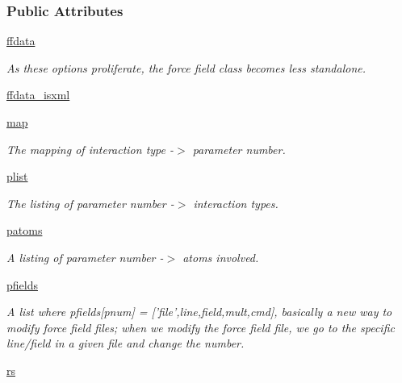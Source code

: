 \subsubsection*{Public Attributes}
\begin{DoxyCompactItemize}
\item 
\hyperlink{classforcebalance_1_1forcefield_1_1FF_aa33e01455044a76e265e6eafbf9c90d6}{ffdata}
\begin{DoxyCompactList}\small\item\em As these options proliferate, the force field class becomes less standalone. \end{DoxyCompactList}\item 
\hyperlink{classforcebalance_1_1forcefield_1_1FF_af942210095e12b4995a64ca461cd5d76}{ffdata\-\_\-isxml}
\item 
\hyperlink{classforcebalance_1_1forcefield_1_1FF_adac6add3391d052c319902ccc8e0a617}{map}
\begin{DoxyCompactList}\small\item\em The mapping of interaction type -\/$>$ parameter number. \end{DoxyCompactList}\item 
\hyperlink{classforcebalance_1_1forcefield_1_1FF_a72d2a63abbeae0b783a1e3e4077b3ab1}{plist}
\begin{DoxyCompactList}\small\item\em The listing of parameter number -\/$>$ interaction types. \end{DoxyCompactList}\item 
\hyperlink{classforcebalance_1_1forcefield_1_1FF_a3b22e1846666d6f704e0620413a95d14}{patoms}
\begin{DoxyCompactList}\small\item\em A listing of parameter number -\/$>$ atoms involved. \end{DoxyCompactList}\item 
\hyperlink{classforcebalance_1_1forcefield_1_1FF_a8f5c9c11cd2f164a2ff6e310c1bc79f1}{pfields}
\begin{DoxyCompactList}\small\item\em A list where pfields\mbox{[}pnum\mbox{]} = \mbox{[}'file',line,field,mult,cmd\mbox{]}, basically a new way to modify force field files; when we modify the force field file, we go to the specific line/field in a given file and change the number. \end{DoxyCompactList}\item 
\hyperlink{classforcebalance_1_1forcefield_1_1FF_acf33c8285b56b92510b5572448c3358e}{rs}

\end{DoxyCompactItemize}
